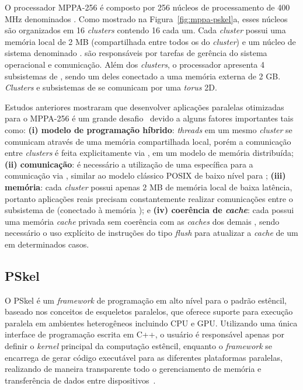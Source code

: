 \documentclass[12pt]{article}
\newcommand{\fw}{\textit{framework}\xspace}
\newcommand{\pskel}{\small \textsf{PSkel}\xspace}
\newcommand{\mppa}{\small \textsf{MPPA-256}\xspace}
\begin{document}
O processador \mppa é composto por 256 núcleos de processamento de 400 MHz
denominados \pes. Como mostrado na Figura~\ref{fig:mppa-pskel}a, esses núcleos
são organizados em 16 \emph{clusters} contendo 16 \pes cada um. Cada
\textit{cluster} possui uma memória local de 2 MB (compartilhada entre todos os
\pes do \textit{cluster}) e um núcleo de sistema denominado \rman. \rmans são
responsáveis por tarefas de gerência do sistema operacional e comunicação. Além
dos \textit{clusters}, o processador apresenta 4 subsistemas de \io, sendo um
deles conectado a uma memória externa \lpddr de 2 GB. \emph{Clusters} e
subsistemas de \io se comunicam por uma \noc \textit{torus} 2D.



Estudos anteriores mostraram que desenvolver aplicações paralelas otimizadas
para o \mppa é um grande desafio~\cite{Castro-IA3-JPDC:2014} devido a alguns
fatores importantes tais como: \textbf{(i) modelo de programação híbrido}:
\textit{threads} em um mesmo \textit{cluster} se comunicam através de uma
memória compartilhada local, porém a comunicação entre \textit{clusters} é feita
explicitamente via \noc, em um modelo de memória distribuída; \textbf{(ii)
comunicação}: é necessário a utilização de uma \api específica para a
comunicação via \noc, similar ao modelo clássico POSIX de baixo nível para \ipc;
\textbf{(iii) memória}: cada \textit{cluster} possui apenas 2 MB de memória
local de baixa latência, portanto aplicações reais precisam constantemente
realizar comunicações entre o subsistema de \io (conectado à memória \lpddr); e
\textbf{(iv) coerência de \textit{cache}}: cada \pe possui uma
memória \textit{cache} privada sem coerência com as \textit{caches} dos demais
\pes, sendo necessário o uso explícito de instruções do tipo \textit{flush} para
atualizar a \textit{cache} de um \pe em determinados casos.

\subsection{PSkel}
\label{subsec:pskel}

O \pskel é um \fw de programação em alto nível para o padrão estêncil, baseado
nos conceitos de esqueletos paralelos, que oferece suporte para execução
paralela em ambientes heterogêneos incluindo CPU e GPU.  Utilizando uma única
interface de programação escrita em C++, o usuário é responsável apenas por
definir o \textit{kernel} principal da computação estêncil, enquanto o \fw se
encarrega de gerar código executável para as diferentes plataformas paralelas,
realizando de maneira transparente todo o gerenciamento de memória e
transferência de dados entre dispositivos~\cite{pereira15}.
\end{document}
